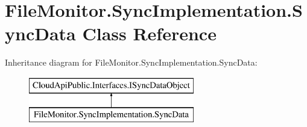 \hypertarget{class_file_monitor_1_1_sync_implementation_1_1_sync_data}{\section{File\-Monitor.\-Sync\-Implementation.\-Sync\-Data Class Reference}
\label{class_file_monitor_1_1_sync_implementation_1_1_sync_data}
}
Inheritance diagram for File\-Monitor.\-Sync\-Implementation.\-Sync\-Data\-:\begin{figure}[H]
\begin{center}
\leavevmode
\includegraphics[height=2.000000cm]{class_file_monitor_1_1_sync_implementation_1_1_sync_data}
\end{center}
\end{figure}
